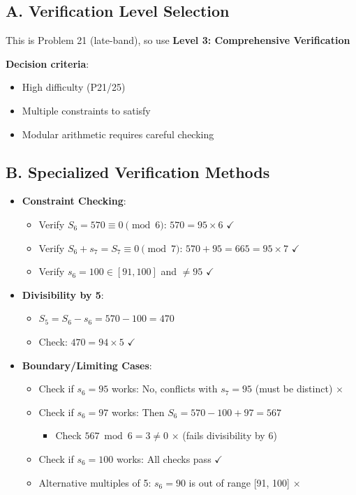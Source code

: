 \documentclass[11pt]{article}
\begin{document}
\begin{verificationbox}
\subsection*{A. Verification Level Selection}
This is Problem 21 (late-band), so use \textbf{Level 3: Comprehensive Verification}

\textbf{Decision criteria}:
\begin{itemize}
    \item High difficulty (P21/25)
    \item Multiple constraints to satisfy
    \item Modular arithmetic requires careful checking
\end{itemize}

\subsection*{B. Specialized Verification Methods}
\begin{itemize}[leftmargin=*]
    \item \textbf{Constraint Checking}:
    \begin{itemize}
        \item Verify $S_6 = 570 \equiv 0 \pmod{6}$: $570 = 95 \times 6$ $\checkmark$
        \item Verify $S_6 + s_7 = S_7 \equiv 0 \pmod{7}$: $570 + 95 = 665 = 95 \times 7$ $\checkmark$
        \item Verify $s_6 = 100 \in [91, 100]$ and $\neq 95$ $\checkmark$
    \end{itemize}
    
    \item \textbf{Divisibility by 5}:
    \begin{itemize}
        \item $S_5 = S_6 - s_6 = 570 - 100 = 470$
        \item Check: $470 = 94 \times 5$ $\checkmark$
    \end{itemize}
    
    \item \textbf{Boundary/Limiting Cases}:
    \begin{itemize}
        \item Check if $s_6 = 95$ works: No, conflicts with $s_7 = 95$ (must be distinct) $\times$
        \item Check if $s_6 = 97$ works: Then $S_6 = 570 - 100 + 97 = 567$
        \begin{itemize}
            \item Check $567 \bmod 6 = 3 \neq 0$ $\times$ (fails divisibility by 6)
        \end{itemize}
        \item Check if $s_6 = 100$ works: All checks pass $\checkmark$
        \item Alternative multiples of 5: $s_6 = 90$ is out of range [91, 100] $\times$
    \end{itemize}
    

\end{itemize}
\end{verificationbox}
\end{document}
